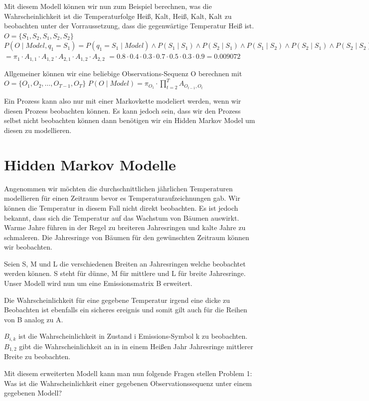 Mit diesem Modell können wir nun zum Beispiel berechnen, was die Wahrscheinlichkeit ist die Temperaturfolge 
{Heiß, Kalt, Heiß, Kalt, Kalt} zu beobachten unter der Vorraussetzung, dass die gegenwärtige Temperatur Heiß ist.
$O = \{S_1, S_2, S_1, S_2, S_2 \}$
$P(O \mid Model, q_1 = S_1) = P(q_1=S_1 \mid Model) 
\wedge P(S_1 \mid S_1) 
\wedge P(S_2 \mid S_1)
\wedge P(S_1 \mid S_2)
\wedge P(S_2 \mid S_1)
\wedge P(S_2 \mid S_2) $
$= \pi_{1} 
\cdot A_{1,1} 
\cdot A_{1,2} 
\cdot A_{2,1}
\cdot A_{1,2}
\cdot A_{2,2}$
$= 0.8 \cdot 0.4 \cdot 0.3 \cdot 0.7 \cdot 0.5 \cdot 0.3 \cdot 0.9 = 0.009072$

Allgemeiner können wir eine beliebige Observations-Sequenz O berechnen mit 
$O = \{O_1, O_2, \dots, O_{T-1}, O_T \}$
$P(O \mid Model) = \pi_{O_1} \cdot \prod_{t = 2}^{T} A_{O_{t-1}, O_t}$

Ein Prozess kann also nur mit einer Markovkette modeliert werden, wenn wir diesen Prozess beobachten können.
Es kann jedoch sein, dass wir den Prozess selbst nicht beobachten können dann benötigen wir ein 
Hidden Markov Model um diesen zu modellieren.


\section{Hidden Markov Modelle}
Angenommen wir möchten die durchschnittlichen jährlichen Temperaturen 
modellieren für einen Zeitraum bevor es Temperaturaufzeichnungen gab.
Wir können die Temperatur in diesem Fall nicht direkt beobachten.
Es ist jedoch bekannt, dass sich die Temperatur auf das Wachstum von Bäumen auswirkt.
Warme Jahre führen in der Regel zu breiteren Jahresringen und kalte Jahre zu schmaleren.
Die Jahresringe von Bäumen für den gewünschten Zeitraum können wir beobachten.

Seien S, M und L die verschiedenen Breiten an Jahresringen welche beobachtet werden können.
S steht für dünne, M für mittlere und L für breite Jahresringe.
Unser Modell wird nun um eine Emissionsmatrix B erweitert.

Die Wahrscheinlichkeit für eine gegebene Temperatur irgend eine dicke zu Beobachten ist 
ebenfalls ein sicheres ereignis und somit gilt auch für die Reihen von B analog zu A.

$B_{i, k}$ ist die Wahrscheinlichkeit in Zustand i Emissions-Symbol k zu beobachten.
$B_{1, 2}$ gibt die Wahrscheinlichkeit an in in einem Heißen Jahr 
Jahresringe mittlerer Breite zu beobachten.

Mit diesem erweiterten Modell kann man nun folgende Fragen stellen
Problem 1:
Was ist die Wahrscheinlichkeit einer gegebenen Observationssequenz unter einem gegebenen Modell?

